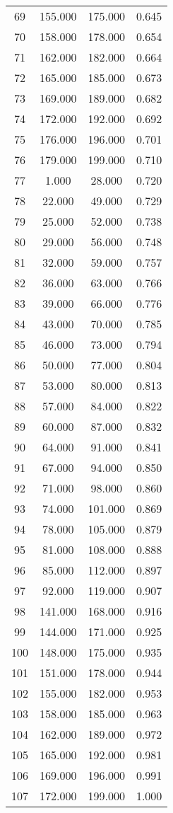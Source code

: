 \begin{tabular}{cccc}
  69 & 155.000 & 175.000 & 0.645 \\ 
  70 & 158.000 & 178.000 & 0.654 \\ 
  71 & 162.000 & 182.000 & 0.664 \\ 
  72 & 165.000 & 185.000 & 0.673 \\ 
  73 & 169.000 & 189.000 & 0.682 \\ 
  74 & 172.000 & 192.000 & 0.692 \\ 
  75 & 176.000 & 196.000 & 0.701 \\ 
  76 & 179.000 & 199.000 & 0.710 \\ 
  77 & 1.000 & 28.000 & 0.720 \\ 
  78 & 22.000 & 49.000 & 0.729 \\ 
  79 & 25.000 & 52.000 & 0.738 \\ 
  80 & 29.000 & 56.000 & 0.748 \\ 
  81 & 32.000 & 59.000 & 0.757 \\ 
  82 & 36.000 & 63.000 & 0.766 \\ 
  83 & 39.000 & 66.000 & 0.776 \\ 
  84 & 43.000 & 70.000 & 0.785 \\ 
  85 & 46.000 & 73.000 & 0.794 \\ 
  86 & 50.000 & 77.000 & 0.804 \\ 
  87 & 53.000 & 80.000 & 0.813 \\ 
  88 & 57.000 & 84.000 & 0.822 \\ 
  89 & 60.000 & 87.000 & 0.832 \\ 
  90 & 64.000 & 91.000 & 0.841 \\ 
  91 & 67.000 & 94.000 & 0.850 \\ 
  92 & 71.000 & 98.000 & 0.860 \\ 
  93 & 74.000 & 101.000 & 0.869 \\ 
  94 & 78.000 & 105.000 & 0.879 \\ 
  95 & 81.000 & 108.000 & 0.888 \\ 
  96 & 85.000 & 112.000 & 0.897 \\ 
  97 & 92.000 & 119.000 & 0.907 \\ 
  98 & 141.000 & 168.000 & 0.916 \\ 
  99 & 144.000 & 171.000 & 0.925 \\ 
  100 & 148.000 & 175.000 & 0.935 \\ 
  101 & 151.000 & 178.000 & 0.944 \\ 
  102 & 155.000 & 182.000 & 0.953 \\ 
  103 & 158.000 & 185.000 & 0.963 \\ 
  104 & 162.000 & 189.000 & 0.972 \\ 
  105 & 165.000 & 192.000 & 0.981 \\ 
  106 & 169.000 & 196.000 & 0.991 \\ 
  107 & 172.000 & 199.000 & 1.000 \\ 
   \hline
\end{tabular}
